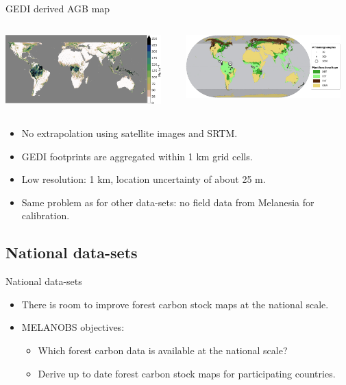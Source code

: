 \documentclass[10pt,table,dvipsnames,compress]{beamer}
\begin{document}
\begin{frame}[label={sec:org6f673d4}]{GEDI derived AGB map}
\begin{columns}
\begin{column}{0.5\columnwidth}
\begin{center}
\includegraphics[width=6cm]{figs/carbon/AGB_GEDI.png}
\end{center}
\end{column}

\begin{column}{0.5\columnwidth}
\begin{center}
\includegraphics[width=6cm]{figs/carbon/training-data-GEDI.png}
\end{center}
\end{column}
\end{columns}

\begin{block}{}
\begin{itemize}
\item No extrapolation using satellite images and SRTM.
\item GEDI footprints are aggregated within 1 km grid cells.
\item Low resolution: 1 km, location uncertainty of about 25 m.
\item Same problem as for other data-sets: no field data from Melanesia for calibration.
\end{itemize}
\end{block}
\end{frame}

\subsection{National data-sets}
\label{sec:orgde5d9c2}

\begin{frame}[label={sec:org2ad9c63}]{National data-sets}
\begin{itemize}
\item There is room to improve forest carbon stock maps at the national scale.

\item MELANOBS objectives:
\begin{itemize}
\item Which forest carbon data is available at the national scale?
\item Derive up to date forest carbon stock maps for participating countries.
\end{itemize}
\end{itemize}
\end{frame}
\end{document}

